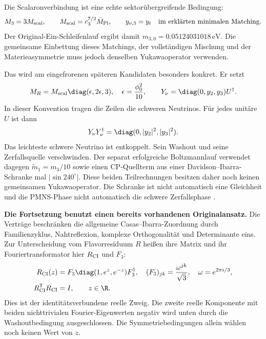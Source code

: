 Die Scalaronverbindung ist eine echte sektorübergreifende Bedingung:
\begin{equation}
M_3=3M_{\rm scal},\qquad
M_{\rm scal}=c_3^{7/2}\bar M_{\rm Pl},\qquad y_{\nu,3}=y_t
\quad\text{im erklärten minimalen Matching.}
\end{equation}
Der Original-Ein-Schleifenlauf ergibt damit $m_{3,0}=0.05124031018\,\mathrm{eV}$. Die gemeinsame Einbettung dieses Matchings, der vollständigen Mischung und der Materieasymmetrie muss jedoch denselben Yukawaoperator verwenden.

Das wird am eingefrorenen späteren Kandidaten besonders konkret. Er setzt
\begin{equation}
M_R=M_{\rm scal}\diag(\epsilon,2\epsilon,3),\quad
\epsilon=\frac{\phi_0^2}{10},\qquad
Y_\nu=\diag(0,y_2,y_3)U^\dagger.
\end{equation}
In dieser Konvention tragen die Zeilen die schweren Neutrinos. Für jedes unitäre $U$ ist dann
\begin{equation}
Y_\nu Y_\nu^\dagger=\diag(0,|y_2|^2,|y_3|^2).
\end{equation}
Das leichteste schwere Neutrino ist entkoppelt. Sein Washout und seine Zerfallsquelle verschwinden. Der separat erfolgreiche Boltzmannlauf verwendet dagegen $\widetilde m_1=m_3/10$ sowie einen CP-Quellterm aus einer Davidson--Ibarra-Schranke mal $|\sin240^\circ|$. Diese beiden Teilrechnungen besitzen daher noch keinen gemeinsamen Yukawaoperator. Die Schranke ist nicht automatisch eine Gleichheit und die PMNS-Phase nicht automatisch die schwere Zerfallsphase \cite{davidsonibarra}.

\textbf{Die Fortsetzung benutzt einen bereits vorhandenen Originalansatz.} Die Verträge  beschränken die allgemeine Casas--Ibarra-Zuordnung \cite{casasibarra} durch Familienzyklus, Nahtreflexion, komplexe Orthogonalität und Determinante eins. Zur Unterscheidung vom Flavorresiduum $R$ heißen ihre Matrix und ihr Fouriertransformator hier $R_{\rm CI}$ und $F_3$:
\begin{align}
R_{\rm CI}(z)&=F_3\diag(1,e^z,e^{-z})F_3^\dagger,
\quad (F_3)_{jk}=\frac{\omega^{jk}}{\sqrt3},\quad \omega=e^{2\pi i/3},\\
R_{\rm CI}^{\mathsf T}R_{\rm CI}&=I,\qquad z\in\R.
\end{align}
Dies ist der identitätsverbundene reelle Zweig. Die zweite reelle Komponente mit beiden nichttrivialen Fourier-Eigenwerten negativ wird unten durch die Washoutbedingung ausgeschlossen. Die Symmetriebedingungen allein wählen noch keinen Wert von $z$.

